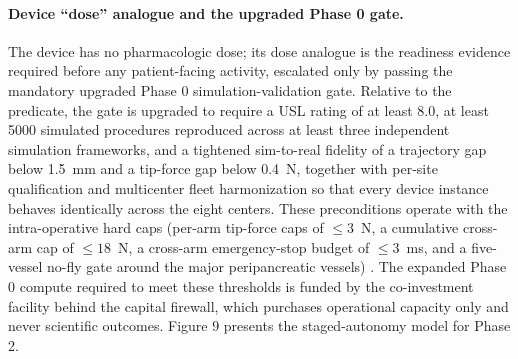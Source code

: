 \paragraph{Device ``dose'' analogue and the upgraded Phase 0 gate.}
The device has no pharmacologic dose; its dose analogue is the readiness evidence
required before any patient-facing activity, escalated only by passing the mandatory
upgraded Phase 0 simulation-validation gate. Relative to the predicate, the gate is
upgraded to require a USL rating of at least 8.0, at least 5000 simulated procedures
reproduced across at least three independent simulation frameworks, and a tightened
sim-to-real fidelity of a trajectory gap below 1.5~mm and a tip-force gap below
0.4~N, together with per-site qualification and multicenter fleet harmonization so
that every device instance behaves identically across the eight centers. These
preconditions operate with the intra-operative hard caps (per-arm tip-force caps of
$\leq 3$~N, a cumulative cross-arm cap of $\leq 18$~N, a cross-arm emergency-stop
budget of $\leq 3$~ms, and a five-vessel no-fly gate around the major peripancreatic
vessels) \cite{ecfr2026part812,kawchak2026adapt312}. The expanded Phase 0 compute
required to meet these thresholds is funded by the co-investment facility behind the
capital firewall, which purchases operational capacity only and never scientific
outcomes. Figure 9 presents the staged-autonomy model for Phase 2.

